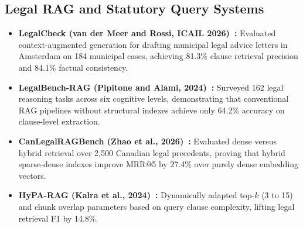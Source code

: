 \documentclass[11pt,a4paper]{article}
\begin{document}
\subsection{Legal RAG and Statutory Query Systems}
\begin{itemize}
    \item \textbf{LegalCheck (van der Meer and Rossi, ICAIL 2026)~\cite{vandermeer2026legalcheck}:} Evaluated context-augmented generation for drafting municipal legal advice letters in Amsterdam on 184 municipal cases, achieving 81.3\% clause retrieval precision and 84.1\% factual consistency.
    \item \textbf{LegalBench-RAG (Pipitone and Alami, 2024)~\cite{pipitone2024legalbench}:} Surveyed 162 legal reasoning tasks across six cognitive levels, demonstrating that conventional RAG pipelines without structural indexes achieve only 64.2\% accuracy on clause-level extraction.
    \item \textbf{CanLegalRAGBench (Zhao et al., 2026)~\cite{zhao2026canlegal}:} Evaluated dense versus hybrid retrieval over 2,500 Canadian legal precedents, proving that hybrid sparse-dense indexes improve MRR@5 by 27.4\% over purely dense embedding vectors.
    \item \textbf{HyPA-RAG (Kalra et al., 2024)~\cite{kalra2024hypa}:} Dynamically adapted top-$k$ (3 to 15) and chunk overlap parameters based on query clause complexity, lifting legal retrieval F1 by 14.8\%.
\end{itemize}
\end{document}
